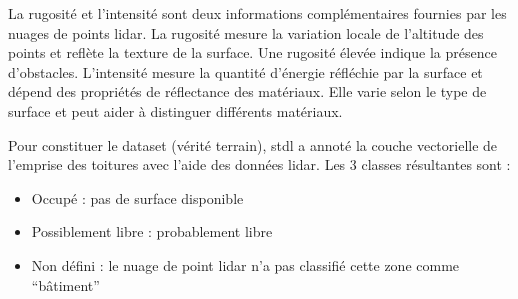 \par{La rugosité et l'intensité sont deux informations complémentaires fournies par les nuages de points \gls{lidar}. La rugosité mesure la variation locale de l'altitude des points et reflète la texture de la surface. Une rugosité élevée indique la présence d'obstacles. L'intensité mesure la quantité d'énergie réfléchie par la surface et dépend des propriétés de réflectance des matériaux. Elle varie selon le type de surface et peut aider à distinguer différents matériaux.}

\par{Pour constituer le dataset (vérité terrain), \acrshort{stdl} a annoté la couche vectorielle de l'emprise des toitures avec l'aide des données \gls{lidar}. Les 3 classes résultantes sont :}
\begin{itemize}
    \item Occupé : pas de surface disponible
    \item Possiblement libre : probablement libre
    \item Non défini : le nuage de point \gls{lidar} n'a pas classifié cette zone comme ``bâtiment''
\end{itemize}

